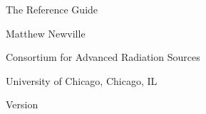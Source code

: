 
\begin{flushright}\vspace*{0.375in}
  \vspace{10mm}{\ThickGreyLine}  \vspace{5mm}
  {\Huge{The {\ifeffit} Reference Guide}}
  \vspace{100mm} {\ }
  
  \thispagestyle{empty}
  \setcounter{page}{0} 
  
  {\Large Matthew Newville}\par
  Consortium for Advanced Radiation Sources\par
  University of Chicago, Chicago, IL\par
  
  \thispagestyle{empty}  \vspace{5mm} {\ThickGreyLine}
  
  {Version {\Vers}}\par
  {\update}\par
  
\end{flushright}

% 


















